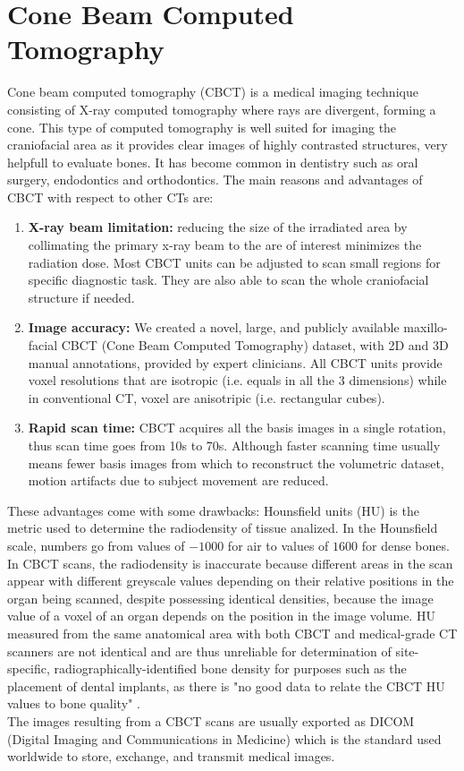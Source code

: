 \section{Cone Beam Computed Tomography}
Cone beam computed tomography (CBCT) is a medical imaging technique consisting
of X-ray computed tomography where rays are divergent, forming a cone. This type
of computed tomography is well suited for imaging the craniofacial area as it
provides clear images of highly contrasted structures, very helpfull to
evaluate bones. It has become common in dentistry such as oral surgery,
endodontics and orthodontics.
The main reasons and advantages of CBCT with respect to other CTs are:
\begin{enumerate}
  \item{\textbf{X-ray beam limitation:} reducing the size of the irradiated area
  by collimating the primary x-ray beam to the are of interest minimizes the
  radiation dose. Most CBCT units can be adjusted to scan small regions for
  specific diagnostic task. They are also able to scan the whole craniofacial
  structure if needed.}
  \item{\textbf{Image accuracy:} We created a novel, large, and publicly
  available maxillo-facial CBCT (Cone Beam Computed Tomography) dataset, with 2D
  and 3D manual annotations, provided by expert clinicians. All CBCT units
  provide voxel resolutions that are isotropic (i.e. equals in all the 3
  dimensions) while in conventional CT, voxel are anisotripic (i.e. rectangular
  cubes).}
  \item{\textbf{Rapid scan time:} CBCT acquires all the basis images in a single
  rotation, thus scan time goes from 10s to 70s. Although faster scanning time
  usually means fewer basis images from which to reconstruct the volumetric
  dataset, motion artifacts due to subject movement are reduced.}
\end{enumerate}
These advantages come with some drawbacks: Hounsfield units (HU) is the metric
used to determine the radiodensity of tissue analized. In the Hounsfield scale,
numbers go from values of $-1000$ for air to values of $1600$ for dense bones.
In CBCT scans, the radiodensity is inaccurate because different areas in the
scan appear with different greyscale values depending on their relative
positions in the organ being scanned, despite possessing identical densities,
because the image value of a voxel of an organ depends on the position in the
image volume. HU measured from the same anatomical area with both CBCT and
medical-grade CT scanners are not identical and are thus unreliable for
determination of site-specific, radiographically-identified bone density for
purposes such as the placement of dental implants, as there is "no good data to
relate the CBCT HU values to bone quality" \cite{Miles2007}.\\
The images resulting from a CBCT scans are usually exported as DICOM (Digital
Imaging and Communications in Medicine) which is the standard used worldwide to
store, exchange, and transmit medical images.

